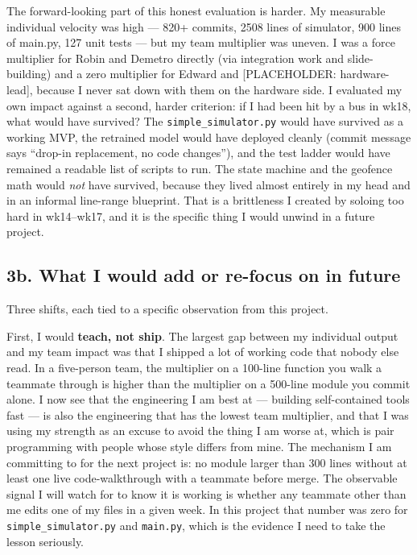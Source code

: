 The forward-looking part of this honest evaluation is harder. My measurable individual velocity was high --- 820+ commits, 2508 lines of simulator, 900 lines of main.py, 127 unit tests --- but my team multiplier was uneven. I was a force multiplier for Robin and Demetro directly (via integration work and slide-building) and a zero multiplier for Edward and [PLACEHOLDER: hardware-lead], because I never sat down with them on the hardware side. I evaluated my own impact against a second, harder criterion: if I had been hit by a bus in wk18, what would have survived? The \texttt{simple\_simulator.py} would have survived as a working MVP, the retrained model would have deployed cleanly (commit message says ``drop-in replacement, no code changes''), and the test ladder would have remained a readable list of scripts to run. The state machine and the geofence math would \emph{not} have survived, because they lived almost entirely in my head and in an informal line-range blueprint. That is a brittleness I created by soloing too hard in wk14--wk17, and it is the specific thing I would unwind in a future project.

\subsection*{3b. What I would add or re-focus on in future}

Three shifts, each tied to a specific observation from this project.

First, I would \textbf{teach, not ship}. The largest gap between my individual output and my team impact was that I shipped a lot of working code that nobody else read. In a five-person team, the multiplier on a 100-line function you walk a teammate through is higher than the multiplier on a 500-line module you commit alone. I now see that the engineering I am best at --- building self-contained tools fast --- is also the engineering that has the lowest team multiplier, and that I was using my strength as an excuse to avoid the thing I am worse at, which is pair programming with people whose style differs from mine. The mechanism I am committing to for the next project is: no module larger than 300 lines without at least one live code-walkthrough with a teammate before merge. The observable signal I will watch for to know it is working is whether any teammate other than me edits one of my files in a given week. In this project that number was zero for \texttt{simple\_simulator.py} and \texttt{main.py}, which is the evidence I need to take the lesson seriously.

